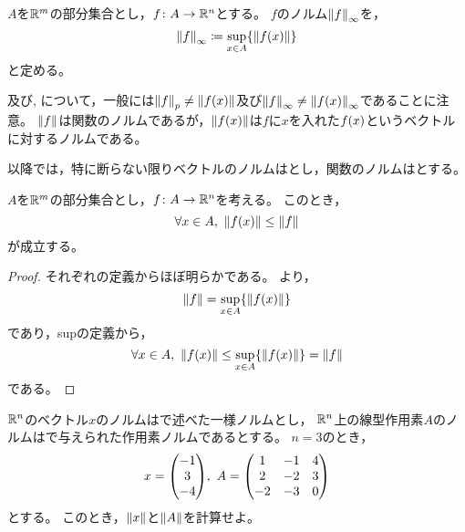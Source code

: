 \documentclass[b5paper,draft]{ltjsbook}
\begin{document}
\begin{defi}
    $A$を$\mathbb{R}^m$の部分集合とし，$f\colon A\to \mathbb{R}^n$とする。
    $f$のノルム$\norm{f}_\infty$を，
    \begin{equation}
        \norm{f}_\infty \coloneqq \sup_{x \in A}\bra{ \norm{\fun{f}{x}} }
    \end{equation}
    と定める。
\end{defi}

\begin{rem}
    及び, について，一般には$\norm{f}_p\ne\norm{\fun{f}{x}}$及び$\norm{f}_\infty\ne\norm{\fun{f}{x}}_\infty$であることに注意。
    $\norm{f}$は関数のノルムであるが，$\norm{\fun{f}{x}}$は$f$に$x$を入れた$\fun{f}{x}$というベクトルに対するノルムである。
\end{rem}

以降では，特に断らない限りベクトルのノルムはとし，関数のノルムはとする。

\begin{lem}
    $A$を$\mathbb{R}^m$の部分集合とし，$f\colon A\to \mathbb{R}^n$を考える。
    このとき，
    \begin{equation}
        \forall x\in A,\ \norm{\fun{f}{x}}\leq \norm{f}
    \end{equation}
    が成立する。
    \begin{proof}
        それぞれの定義からほぼ明らかである。
        より，
        \begin{equation}
            \norm{f} = \sup_{x \in A}\bra{ \norm{\fun{f}{x}} }
        \end{equation}
        であり，supの定義から，
        \begin{equation}
            \forall x\in A,\  \norm{\fun{f}{x}}\leq \sup_{x \in A}\bra{ \norm{\fun{f}{x}} } = \norm{f}
        \end{equation}
        である。
    \end{proof}
\end{lem}


\begin{prob}
    $\mathbb{R}^n$のベクトル$x$のノルムはで述べた一様ノルムとし，
    $\mathbb{R}^n$上の線型作用素$A$のノルムはで与えられた作用素ノルムであるとする。
    $n=3$のとき，
    \begin{equation}
        x=\vctr{-1\\3\\-4},\
        A=\pmat{1 & -1 & 4\\
            2 & -2 & 3\\
            -2 & -3 & 0
            }
    \end{equation}
    とする。
    このとき，$\norm{x}$と$\norm{A}$を計算せよ。
\end{prob}
\end{document}
